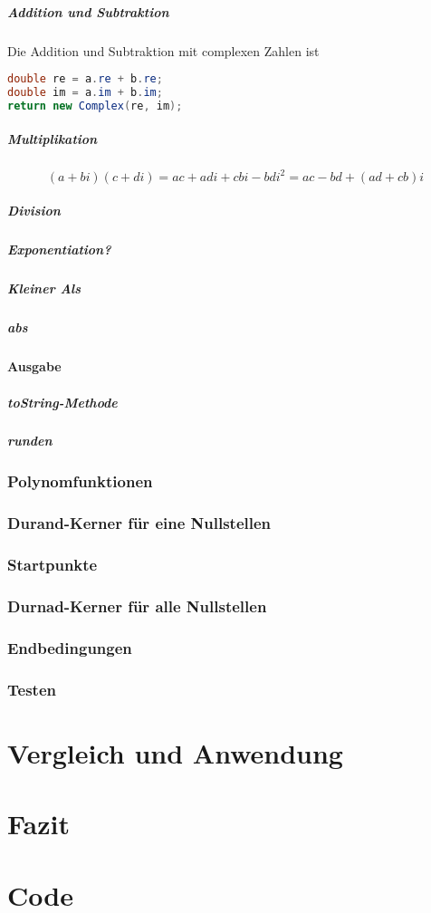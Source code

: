 \documentclass[12pt]{article}
\begin{document}
    \subparagraph{Addition und Subtraktion}
    Die Addition und Subtraktion mit complexen Zahlen ist 
    \begin{lstlisting}[language=Java, title={Complex.java: Z. 22-24}]
double re = a.re + b.re;
double im = a.im + b.im;
return new Complex(re, im);
    \end{lstlisting}
    \subparagraph{Multiplikation}
    \begin{displaymath}
        (a+bi)(c+di) = ac+adi+cbi-bdi^2 = ac-bd+(ad+cb)i
    \end{displaymath}
    \subparagraph{Division}
    \subparagraph{Exponentiation?}
    \subparagraph{Kleiner Als}


    \subparagraph{abs}

    \paragraph{Ausgabe}
    \subparagraph{toString-Methode}
    \subparagraph{runden}

    
    \subsubsection{Polynomfunktionen}
    \subsubsection{Durand-Kerner für eine Nullstellen}
    \subsubsection{Startpunkte}
    \subsubsection{Durnad-Kerner für alle Nullstellen}
    \subsubsection{Endbedingungen}
    \subsubsection{Testen}

\section{Vergleich und Anwendung}

\section{Fazit}

\section{Code}
\end{document}
